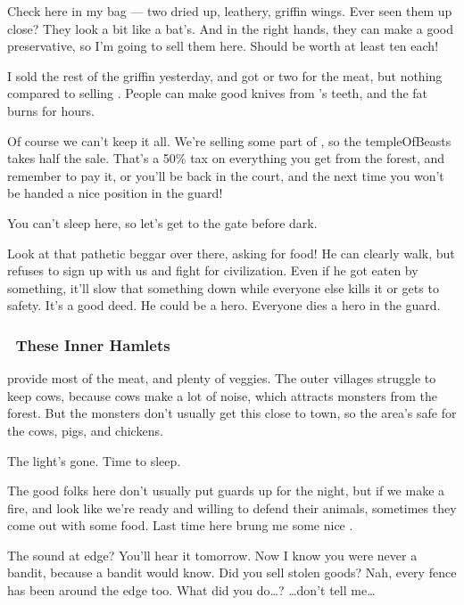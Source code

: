 Check here in my bag --- two dried up, leathery, \gls{griffin} wings.
Ever seen them up close?
They look a bit like a bat's.
And in the right hands, they can make a good preservative, so I'm going to sell them here.
Should be worth at least ten  each!

I sold the rest of the \gls{griffin} yesterday, and got  or two for the meat, but nothing compared to selling .
People can make good knives from 's teeth, and the fat burns for hours.

Of course we can't keep it all.
We're selling some part of , so the \gls{templeOfBeasts} takes half the sale.
That's a 50\% tax on everything you get from the forest, and remember to pay it, or you'll be back in the \gls{court}, and the next time you won't be handed a nice position in the \gls{guard}!

You can't sleep here, so let's get to the gate before dark.

Look at that pathetic beggar over there, asking for food!
He can clearly walk, but refuses to sign up with us and fight for civilization.
Even if he got eaten by something, it'll slow that something down while everyone else kills it or gets to safety.
It's a good deed.
He could be a hero.
Everyone dies a hero in the \gls{guard}.

\subsubsection*{~These Inner Hamlets}
provide most of the meat, and plenty of veggies.
The outer \glspl{village} struggle to keep cows, because cows make a lot of noise, which attracts \glspl{monster} from the forest.
But the \glspl{monster} don't usually get this close to town, so the area's safe for the cows, pigs, and chickens.

The light's gone.
Time to sleep.

The good folks here don't usually put \glspl{guard} up for the night, but if we make a fire, and look like we're ready and willing to defend their animals, sometimes they come out with some food.
Last time here  brung me some nice \rations.

The sound at \gls{edge}?
You'll hear it tomorrow.
Now I know you were never a bandit, because a bandit would know.
Did you sell stolen goods?
Nah, every fence has been around the \gls{edge} too.
What did you do\ldots?
\ldots don't tell me\ldots

